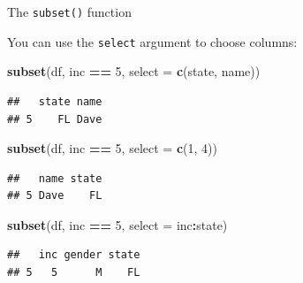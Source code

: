 \documentclass[ignorenonframetext,]{beamer}
\newenvironment{Shaded}{\begin{snugshade}}{\end{snugshade}}
\newcommand{\DataTypeTok}[1]{\textcolor[rgb]{0.13,0.29,0.53}{#1}}
\newcommand{\DecValTok}[1]{\textcolor[rgb]{0.00,0.00,0.81}{#1}}
\newcommand{\KeywordTok}[1]{\textcolor[rgb]{0.13,0.29,0.53}{\textbf{#1}}}
\newcommand{\NormalTok}[1]{#1}
\newcommand{\OperatorTok}[1]{\textcolor[rgb]{0.81,0.36,0.00}{\textbf{#1}}}
\newcommand{\StringTok}[1]{\textcolor[rgb]{0.31,0.60,0.02}{#1}}
\begin{document}
\begin{frame}[fragile]{The \texttt{subset()} function}
\protect\hypertarget{the-subset-function-4}{}

You can use the \texttt{select} argument to choose columns:

\begin{Shaded}
\begin{Highlighting}[]
\KeywordTok{subset}\NormalTok{(df, inc }\OperatorTok{==}\StringTok{ }\DecValTok{5}\NormalTok{, }\DataTypeTok{select =} \KeywordTok{c}\NormalTok{(state, name))}
\end{Highlighting}
\end{Shaded}

\begin{verbatim}
##   state name
## 5    FL Dave
\end{verbatim}

\begin{Shaded}
\begin{Highlighting}[]
\KeywordTok{subset}\NormalTok{(df, inc }\OperatorTok{==}\StringTok{ }\DecValTok{5}\NormalTok{, }\DataTypeTok{select =} \KeywordTok{c}\NormalTok{(}\DecValTok{1}\NormalTok{, }\DecValTok{4}\NormalTok{))}
\end{Highlighting}
\end{Shaded}

\begin{verbatim}
##   name state
## 5 Dave    FL
\end{verbatim}

\begin{Shaded}
\begin{Highlighting}[]
\KeywordTok{subset}\NormalTok{(df, inc }\OperatorTok{==}\StringTok{ }\DecValTok{5}\NormalTok{, }\DataTypeTok{select =}\NormalTok{ inc}\OperatorTok{:}\NormalTok{state)}
\end{Highlighting}
\end{Shaded}

\begin{verbatim}
##   inc gender state
## 5   5      M    FL
\end{verbatim}

\end{frame}
\end{document}
